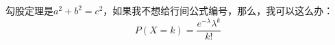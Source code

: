 \documentclass[]{article}
\begin{document}
勾股定理是$a^2 + b^2 = c^2$，如果我不想给行间公式编号，那么，我可以这么办：
\[ P(X=k) = \frac{e^{-\lambda}\lambda^k}{k!}\]
\end{document}

